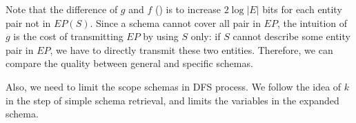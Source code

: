 \noindent
Note that the difference of $g$ and $f$ () is to increase
$2 \log |E|$ bits for each entity pair not in $EP(S)$.
Since a schema cannot cover all pair in $EP$, the intuition of $g$ is the cost of 
transmitting $EP$ by using $S$ only: if $S$ cannot describe some entity pair in $EP$,
we have to directly transmit these two entities.
Therefore, we can compare the quality between general and specific schemas.

Also, we need to limit the scope schemas in DFS process. We follow the idea of $k$
in the step of simple schema retrieval, and limits the variables in the expanded
schema.

